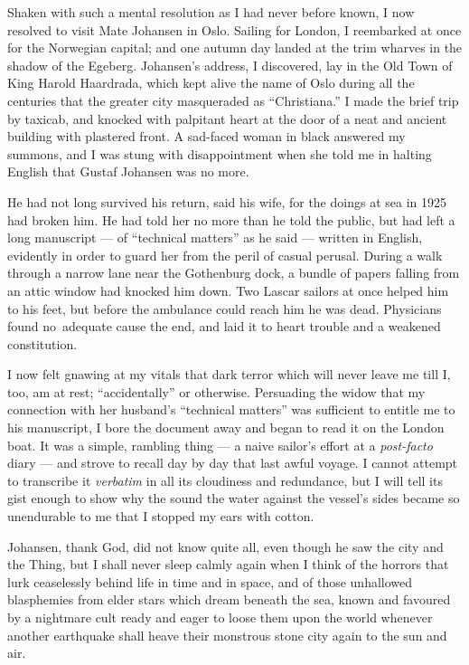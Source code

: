 Shaken with such a mental resolution as I had never before known, I now
resolved to visit Mate Johansen in Oslo. Sailing for London, I
reembarked at once for the Norwegian capital; and one autumn day landed
at the trim wharves in the shadow of the Egeberg. Johansen's address, I
discovered, lay in the Old Town of King Harold Haardrada, which kept
alive the name of Oslo during all the centuries that the greater city
masqueraded as ``Christiana.'' I made the brief trip by taxicab, and
knocked with palpitant heart at the door of a neat and ancient building
with plastered front. A sad-faced woman in black answered my summons,
and I was stung with disappointment when she told me in halting English
that Gustaf Johansen was no more.

He had not long survived his return, said his wife, for the doings at
sea in 1925 had broken him. He had told her no more than he told the
public, but had left a long manuscript --- of ``technical matters'' as he
said --- written in English, evidently in order to guard her from the
peril of casual perusal. During a walk through a narrow lane near the
Gothenburg dock, a bundle of papers falling from an attic window had
knocked him down. Two Lascar sailors at once helped him to his feet, but
before the ambulance could reach him he was dead. Physicians found no\est\
adequate cause the end, and laid it to heart trouble and a weakened
constitution.

I now felt gnawing at my vitals that dark terror which
will never leave me till I, too, am at rest; ``accidentally'' or
otherwise. Persuading the widow that my connection with her husband's
``technical matters'' was sufficient to entitle me to his manuscript, I
bore the document away and began to read it on the London boat.
It was a simple, rambling thing --- a naive sailor's effort at a
\emph{post-facto} diary --- and strove to recall day by day that last awful
voyage. I cannot attempt to transcribe it \emph{verbatim} in all its cloudiness
and redundance, but I will tell its gist enough to show why the sound
the water against the vessel's sides became so unendurable to me that I
stopped my ears with cotton.

Johansen, thank God, did not know quite all, even though he saw the city
and the Thing, but I shall never sleep calmly again when I think of the
horrors that lurk ceaselessly behind life in time and in space, and of
those unhallowed blasphemies from elder stars which dream beneath the
sea, known and favoured by a nightmare cult ready and eager to loose
them upon the world whenever another earthquake shall heave their
monstrous stone city again to the sun and air.

